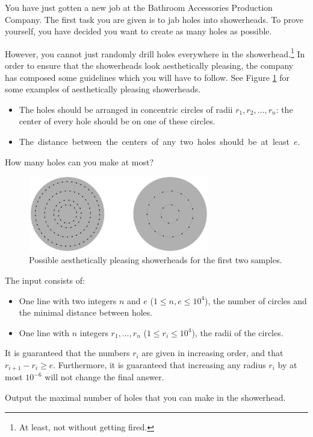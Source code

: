 

\newcommand{\showermaxn}{10^4}
\newcommand{\showermaxdist}{10^4}

You have just gotten a new job at the Bathroom Accessories Production Company.
The first task you are given is to jab holes into showerheads.
To prove yourself, you have decided you want to create as many holes as possible.

However, you cannot just randomly drill holes everywhere in the showerhead.\footnote{At least, not without getting fired.}
In order to ensure that the showerheads look aesthetically pleasing,
the company has composed some guidelines which you will have to follow. See Figure \ref{fig:J-example} for some examples of aesthetically pleasing showerheads.
\begin{itemize}
\item The holes should be arranged in concentric circles of radii $r_1, r_2, \ldots, r_n$:
    the center of every hole should be on one of these circles.
\item \mbox{The distance between the centers of any two holes should be at least $e$.}
\end{itemize}

How many holes can you make at most?

\begin{figure}[htb]
	\centering
	\includegraphics[width=0.7\textwidth]{figure.pdf}
	\caption{
		Possible aesthetically pleasing showerheads for the first two samples.
	}
	\label{fig:J-example}
\end{figure}

\begin{Input}
    The input consists of:
    \begin{itemize}
        \item One line with two integers $n$ and $e$
			($1 \leq n, e \leq \showermaxn$), %
			the number of circles and the minimal distance between holes.
		\item One line with $n$ integers $r_1, \ldots, r_n$
			($1 \leq r_i \leq \showermaxdist$), the radii of the circles.
    \end{itemize}
    It is guaranteed that the numbers $r_i$ are given in increasing order, and
    that $r_{i+1} - r_i \geq e$.
    Furthermore, it is guaranteed that increasing any radius $r_i$ by at most $10^{-6}$
    will not change the final answer.
\end{Input}

\begin{Output}
    Output the maximal number of holes that you can make in the showerhead.
\end{Output}
